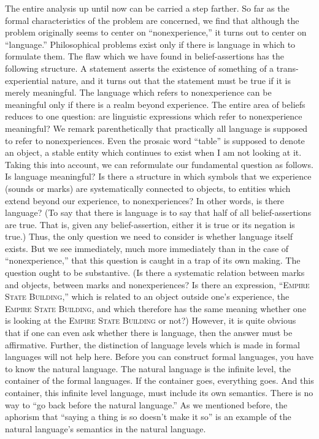 The entire analysis up until now can be carried a step farther. So far as 
the formal characteristics of the problem are concerned, we find that 
although the problem originally seems to center on \enquote{nonexperience,} it 
turns out to center on \enquote{language.} Philosophical problems exist only if there 
is language in which to formulate them. The flaw which we have found in 
belief-assertions has the following structure. A statement asserts the 
existence of something of a trans-experiential nature, and it turns out that 
the statement must be true if it is merely meaningful. The language which 
refers to nonexperience can be meaningful only if there is a realm beyond 
experience. The entire area of beliefs reduces to one question: are linguistic 
expressions which refer to nonexperience meaningful? We remark 
parenthetically that practically all language is supposed to refer to 
nonexperiences. Even the prosaic word \enquote{table} is supposed to denote an 
object, a stable entity which continues to exist when I am not looking at it. 
Taking this into account, we can reformulate our fundamental question as 
follows. Is language meaningful? Is there a structure in which symbols that 
we experience (sounds or marks) are systematically connected to objects, to 
entities which extend beyond our experience, to nonexperiences? In other 
words, is there language? (To say that there is language is to say that half of 
all belief-assertions are true. That is, given any belief-assertion, either it is 
true or its negation is true.) Thus, the only question we need to consider is 
whether language itself exists. But we see immediately, much more 
immediately than in the case of \enquote{nonexperience,} that this question is 
caught in a trap of its own making. The question ought to be substantive. (Is 
there a systematic relation between marks and objects, between marks and 
nonexperiences? Is there an expression, \enquote{\textsc{Empire State Building,}} which is 
related to an object outside one's experience, the \textsc{Empire State Building}, and 
which therefore has the same meaning whether one is looking at the \textsc{Empire 
State Building} or not?) However, it is quite obvious that if one can even ask 
whether there is language, then the answer must be affirmative. Further, the 
distinction of language levels which is made in formal languages will not help 
here. Before you can construct formal languages, you have to know the 
natural language. The natural language is the infinite level, the container of 
the formal languages. If the container goes, everything goes. And this 
container, this infinite level language, must include its own semantics. There 
is no way to \enquote{go back before the natural language.} As we mentioned 
before, the aphorism that \enquote{saying a thing is so doesn't make it so} is an 
example of the natural language's semantics in the natural language. 

